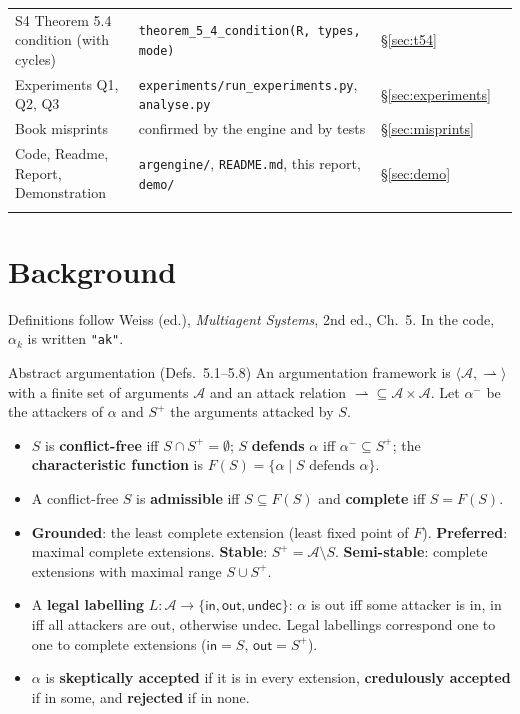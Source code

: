 \documentclass[10pt,a4paper]{article}
\newcommand{\yes}{\textcolor{good}{\ding{51}}}
\newcommand{\code}[1]{\textcolor{brand!85!black}{\texttt{#1}}}
\newcommand{\tabend}{\arrayrulecolor{brand}\specialrule{0.8pt}{0pt}{0pt}\arrayrulecolor{black}}
\newcommand{\att}{\rightharpoonup}          %
\newcommand{\AF}{\langle\mathcal{A},\att\rangle}
\newcommand{\Args}{\mathcal{A}}
\begin{document}
\begin{table}[H]
\begin{tabularx}{\textwidth}{>{\raggedright\arraybackslash}X >{\raggedright\arraybackslash}p{7.0cm} >{\raggedright\arraybackslash}p{1.3cm} c}
\rowcolor{white} S4 Theorem 5.4 condition (with cycles) & \code{theorem\_5\_4\_condition(R, types, mode)} & \S\ref{sec:t54} & \yes\\
\rowcolor{rowalt} Experiments Q1, Q2, Q3 & \code{experiments/run\_experiments.py}, \code{analyse.py} & \S\ref{sec:experiments} & \yes\\
\rowcolor{white} Book misprints & confirmed by the engine and by tests & \S\ref{sec:misprints} & \yes\\
\rowcolor{rowalt} Code, Readme, Report, Demonstration & \code{argengine/}, \code{README.md}, this report, \code{demo/} & \S\ref{sec:demo} & \yes\\
\tabend
\end{tabularx}
\end{table}

\section{Background}\label{sec:background}

Definitions follow Weiss (ed.), \emph{Multiagent Systems}, 2nd ed., Ch.~5. In the code, $\alpha_k$ is written \code{"ak"}.

\begin{defbox}{Abstract argumentation (Defs.~5.1--5.8)}
An argumentation framework is $\AF$ with a finite set of arguments $\Args$ and an attack relation ${\att}\subseteq\Args\times\Args$.
Let $\alpha^-$ be the attackers of $\alpha$ and $S^+$ the arguments attacked by $S$.
\begin{itemize}
  \item $S$ is \textbf{conflict-free} iff $S\cap S^+=\emptyset$; $S$ \textbf{defends} $\alpha$ iff $\alpha^-\subseteq S^+$;
        the \textbf{characteristic function} is $F(S)=\{\alpha\mid S \text{ defends } \alpha\}$.
  \item A conflict-free $S$ is \textbf{admissible} iff $S\subseteq F(S)$ and \textbf{complete} iff $S=F(S)$.
  \item \textbf{Grounded}: the least complete extension (least fixed point of $F$). \textbf{Preferred}: maximal complete
        extensions. \textbf{Stable}: $S^+=\Args\setminus S$. \textbf{Semi-stable}: complete extensions with maximal range
        $S\cup S^+$.
  \item A \textbf{legal labelling} $L:\Args\to\{\textsf{in},\textsf{out},\textsf{undec}\}$: $\alpha$ is \textsf{out} iff some
        attacker is \textsf{in}, \textsf{in} iff all attackers are \textsf{out}, otherwise \textsf{undec}. Legal labellings
        correspond one to one to complete extensions ($\textsf{in}=S$, $\textsf{out}=S^+$).
  \item $\alpha$ is \textbf{skeptically accepted} if it is in every extension, \textbf{credulously accepted} if in some, and
        \textbf{rejected} if in none.
\end{itemize}
\end{defbox}
\end{document}
